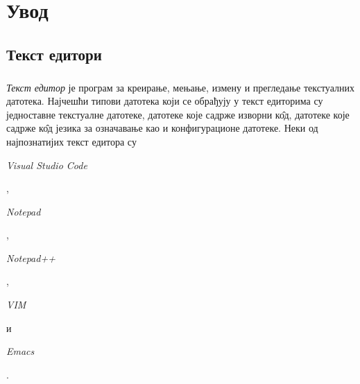 \documentclass[12pt,oneside]{memoir}
\begin{document}
\frontmatter
\naslovna
\komisija
\posveta{}
\apstrakt
\tableofcontents*

\mainmatter

\chapter{Увод}

\section{Текст едитори}

\paragraph{}
\emph{Текст едитор} је програм за креирање, мењање, измену и прегледање текстуалних датотека. Најчешћи типови датотека
који се обрађују у текст едиторима су једноставне текстуалне датотеке, 
датотеке које садрже изворни к\^{о}д, датотеке које садрже к\^{о}д језика за означавање као и конфигурационе датотеке.  Неки од најпознатијих текст едитора су \begin{latinica}\textit{Visual Studio Code}
\end{latinica} \cite{VSC}, \begin{latinica}\textit{Notepad}\end{latinica} \cite{Notepad},
\begin{latinica}\textit{Notepad++}\end{latinica} \cite{Notepad++}, \begin{latinica}\textit{VIM}
\end{latinica} \cite{VIM} и \begin{latinica}\textit{Emacs}\end{latinica} \cite{Emacs}.
\end{document}
